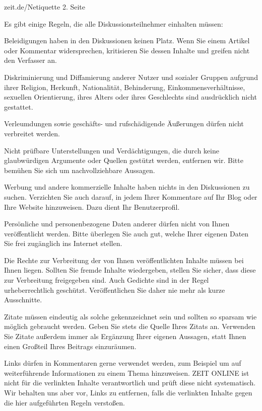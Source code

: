 zeit.de/Netiquette 2. Seite

Es gibt einige Regeln, die alle Diskussionsteilnehmer einhalten müssen:
 
 Beleidigungen haben in den Diskussionen keinen Platz. Wenn Sie einem Artikel oder Kommentar widersprechen, kritisieren Sie dessen Inhalte und greifen nicht den Verfasser an.

Diskriminierung und Diffamierung anderer Nutzer und sozialer Gruppen aufgrund ihrer Religion, Herkunft, Nationalität, Behinderung, Einkommensverhältnisse, sexuellen Orientierung, ihres Alters oder ihres Geschlechts sind ausdrücklich nicht gestattet.

Verleumdungen sowie geschäfts- und rufschädigende Äußerungen dürfen nicht verbreitet werden.

Nicht prüfbare Unterstellungen und Verdächtigungen, die durch keine glaubwürdigen Argumente oder Quellen gestützt werden, entfernen wir. Bitte bemühen Sie sich um nachvollziehbare Aussagen.

Werbung und andere kommerzielle Inhalte haben nichts in den Diskussionen zu suchen. Verzichten Sie auch darauf, in jedem Ihrer Kommentare auf Ihr Blog oder Ihre Website hinzuweisen. Dazu dient Ihr Benutzerprofil.

Persönliche und personenbezogene Daten anderer dürfen nicht von Ihnen veröffentlicht werden. Bitte überlegen Sie auch gut, welche Ihrer eigenen Daten Sie frei zugänglich ins Internet stellen.

Die Rechte zur Verbreitung der von Ihnen veröffentlichten Inhalte müssen bei Ihnen liegen. Sollten Sie fremde Inhalte wiedergeben, stellen Sie sicher, dass diese zur Verbreitung freigegeben sind. Auch Gedichte sind in der Regel urheberrechtlich geschützt. Veröffentlichen Sie daher nie mehr als kurze Ausschnitte.

Zitate müssen eindeutig als solche gekennzeichnet sein und sollten so sparsam wie möglich gebraucht werden. Geben Sie stets die Quelle Ihres Zitats an. Verwenden Sie Zitate außerdem immer als Ergänzung Ihrer eigenen Aussagen, statt Ihnen einen Großteil Ihres Beitrags einzuräumen.

Links dürfen in Kommentaren gerne verwendet werden, zum Beispiel um auf weiterführende Informationen zu einem Thema hinzuweisen. ZEIT ONLINE ist nicht für die verlinkten Inhalte verantwortlich und prüft diese nicht systematisch. Wir behalten uns aber vor, Links zu entfernen, falls die verlinkten Inhalte gegen die hier aufgeführten Regeln verstoßen.